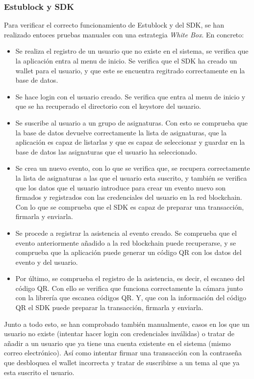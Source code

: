 \subsubsection{Estublock y SDK}

Para verificar el correcto funcionamiento de Estublock y del SDK, se han realizado entoces pruebas manuales con una estrategia \emph{White Box}. En concreto: 
\begin{itemize}
\item Se realiza el registro de un usuario que no existe en el sistema, se verifica que la aplicación entra al menu de inicio. Se verifica que el SDK ha creado un wallet para el usuario, y que este se encuentra regitrado correctamente en la base de datos.
\item Se hace login con el usuario creado. Se verifica que entra al menu de inicio y que se ha recuperado el directorio con el keystore del usuario.
\item Se suscribe al usuario a un grupo de asignaturas. Con esto se comprueba que la base de datos devuelve correctamente la lista de asignaturas, que la aplicación es capaz de listarlas y que es capaz de seleccionar y guardar en la base de datos las asignaturas que el usuario ha seleccionado.
\item Se crea un nuevo evento, con lo que se verifica que, se recupera correctamente la lista de asignaturas a las que el usuario esta suscrito, y también se verifica que los datos que el usuario introduce para crear un evento nuevo son firmados y registrados con las credenciales del usuario en la red blockchain. Con lo que se comprueba que el SDK es capaz de preparar una transacción, firmarla y enviarla. 
\item Se procede a registrar la asistencia al evento creado. Se comprueba que el evento anteriormente añadido a la red blockchain puede recuperarse, y se comprueba que la aplicación puede generar un código QR con los datos del evento y del usuario.
\item Por último, se comprueba el registro de la asistencia, es decir, el escaneo del código QR. Con ello se verifica que funciona correctamente la cámara junto con la librería que escanea códigos QR. Y, que con la información del código QR el SDK puede preparar la transacción, firmarla y enviarla. 
\end{itemize}

Junto a todo esto, se han comprobado también manualmente, casos en los que un usuario no existe (intentar hacer login con credenciales inválidas) o tratar de añadir a un usuario que ya tiene una cuenta existente en el sistema (mismo correo electrónico). Así como intentar firmar una transacción con la contraseña que desbloquea el wallet incorrecta y tratar de suscribirse a un tema al que ya esta suscrito el usuario. \\

